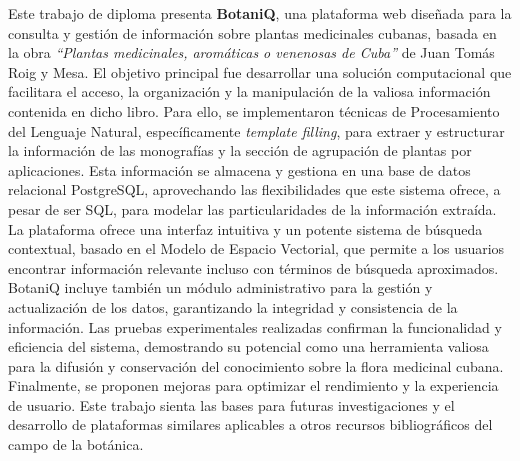 \begin{resumen}
	Este trabajo de diploma presenta \textbf{BotaniQ}, una plataforma web diseñada 
	para la consulta y gestión de información sobre plantas medicinales cubanas, 
	basada en la obra \textit{``Plantas medicinales, aromáticas o venenosas de Cuba''} 
	de Juan Tomás Roig y Mesa. El objetivo principal fue desarrollar una 
	solución computacional que facilitara el acceso, la organización y la 
	manipulación de la valiosa información contenida en dicho libro. 
	Para ello, se implementaron técnicas de Procesamiento del Lenguaje Natural, 
	específicamente \textit{template filling}, para extraer y estructurar la 
	información de las monografías y la sección de agrupación de plantas por 
	aplicaciones. Esta información se almacena y gestiona en una base de datos 
	relacional PostgreSQL, aprovechando las flexibilidades que este sistema ofrece, 
	a pesar de ser SQL, para modelar las particularidades de la información extraída. 
	La plataforma ofrece una interfaz intuitiva y un potente sistema de búsqueda contextual, 
	basado en el Modelo de Espacio Vectorial, que permite a los usuarios encontrar 
	información relevante incluso con términos de búsqueda aproximados. BotaniQ 
	incluye también un módulo administrativo para la gestión y actualización de 
	los datos, garantizando la integridad y consistencia de la información. 
	Las pruebas experimentales realizadas confirman la funcionalidad y eficiencia 
	del sistema, demostrando su potencial como una herramienta valiosa para la 
	difusión y conservación del conocimiento sobre la flora medicinal cubana. 
	Finalmente, se proponen mejoras para optimizar el rendimiento y la experiencia 
	de usuario. Este trabajo sienta las bases para futuras investigaciones y 
	el desarrollo de plataformas similares aplicables a otros recursos bibliográficos 
	del campo de la botánica.
\end{resumen}

